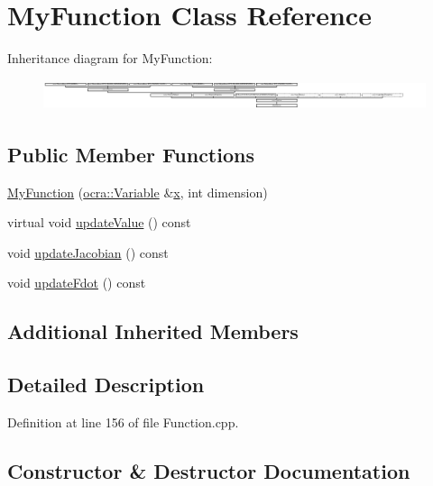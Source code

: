 \hypertarget{classMyFunction}{}\section{My\+Function Class Reference}
\label{classMyFunction}
Inheritance diagram for My\+Function\+:\begin{figure}[H]
\begin{center}
\leavevmode
\includegraphics[height=0.901771cm]{db/d8c/classMyFunction}
\end{center}
\end{figure}
\subsection*{Public Member Functions}
\begin{DoxyCompactItemize}
\item 
\hyperlink{classMyFunction_addcad41fa4e120bf9decb70b4b22f935}{My\+Function} (\hyperlink{classocra_1_1Variable}{ocra\+::\+Variable} \&\hyperlink{classocra_1_1Function_a28825886d1f149c87b112ec2ec1dd486}{x}, int dimension)
\item 
virtual void \hyperlink{classMyFunction_a53829722ebc3fce3d1fa9b96c61b2b53}{update\+Value} () const
\item 
void \hyperlink{classMyFunction_a5ff3f1717385a96fe60fb1b993db0ef3}{update\+Jacobian} () const
\item 
void \hyperlink{classMyFunction_af0219da97114570582c6a02cf072a7db}{update\+Fdot} () const
\end{DoxyCompactItemize}
\subsection*{Additional Inherited Members}


\subsection{Detailed Description}


Definition at line 156 of file Function.\+cpp.



\subsection{Constructor \& Destructor Documentation}
\hypertarget{classMyFunction_addcad41fa4e120bf9decb70b4b22f935}{}\label{classMyFunction_addcad41fa4e120bf9decb70b4b22f935} 
